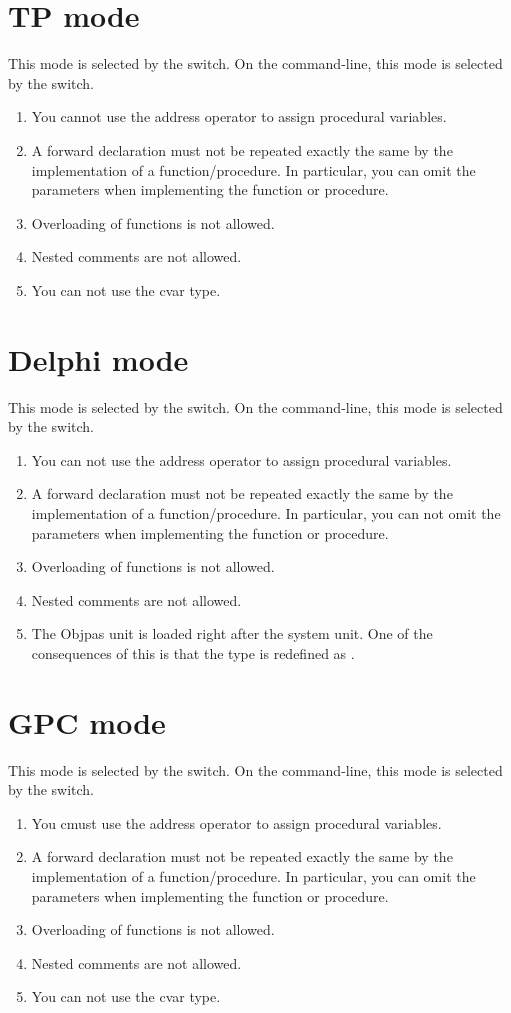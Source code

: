 \documentclass{report}
\begin{document}
\section{TP mode}
This mode is selected by the  switch. On the command-line,
this mode is selected by the  switch.

\begin{enumerate}
\item You cannot use the address operator to assign procedural variables.
\item A forward declaration must not be repeated exactly the same by the
implementation of a function/procedure. In particular, you can omit the
parameters when implementing the function or procedure.
\item Overloading of functions is not allowed.
\item Nested comments are not allowed.
\item You can not use the cvar type.
\end{enumerate}
\section{Delphi mode}
This mode is selected by the  switch. On the command-line,
this mode is selected by the  switch.
\begin{enumerate}
\item You can not use the address operator to assign procedural variables.
\item A forward declaration must not be repeated exactly the same by the
implementation of a function/procedure. In particular, you can not omit the
parameters when implementing the function or procedure.
\item Overloading of functions is not allowed.
\item Nested comments are not  allowed.
\item The Objpas unit is loaded right after the system unit. One of the
consequences of this is that the type  is redefined as
.
\end{enumerate}
\section{GPC mode}
This mode is selected by the  switch. On the command-line,
this mode is selected by the  switch.
\begin{enumerate}
\item You cmust use the address operator to assign procedural variables.
\item A forward declaration must not be repeated exactly the same by the
implementation of a function/procedure. In particular, you can omit the
parameters when implementing the function or procedure.
\item Overloading of functions is not allowed.
\item Nested comments are not allowed.
\item You can not use the cvar type.
\end{enumerate}
\end{document}
